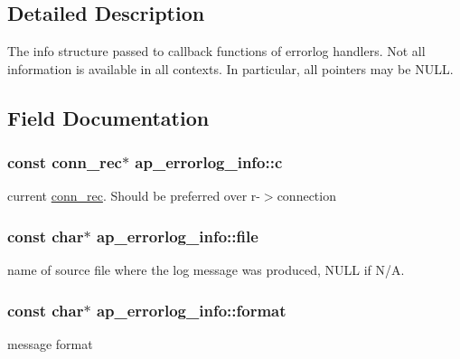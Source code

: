 \subsection{Detailed Description}
The info structure passed to callback functions of errorlog handlers. Not all information is available in all contexts. In particular, all pointers may be N\+U\+LL. 

\subsection{Field Documentation}
\subsubsection[{\texorpdfstring{c}{c}}]{\setlength{\rightskip}{0pt plus 5cm}const {\bf conn\+\_\+rec}$\ast$ ap\+\_\+errorlog\+\_\+info\+::c}\hypertarget{structap__errorlog__info_afe8544f296d2a66d60a7ded1e09f2755}{}\label{structap__errorlog__info_afe8544f296d2a66d60a7ded1e09f2755}
current \hyperlink{structconn__rec}{conn\+\_\+rec}. Should be preferred over r-\/$>$connection 
\subsubsection[{\texorpdfstring{file}{file}}]{\setlength{\rightskip}{0pt plus 5cm}const char$\ast$ ap\+\_\+errorlog\+\_\+info\+::file}\hypertarget{structap__errorlog__info_a6cfae448e006d900d8c3292af4bdcc41}{}\label{structap__errorlog__info_a6cfae448e006d900d8c3292af4bdcc41}
name of source file where the log message was produced, N\+U\+LL if N/A. 
\subsubsection[{\texorpdfstring{format}{format}}]{\setlength{\rightskip}{0pt plus 5cm}const char$\ast$ ap\+\_\+errorlog\+\_\+info\+::format}\hypertarget{structap__errorlog__info_a5f5ee5ad1925c3f59f1b792d902ab9d3}{}\label{structap__errorlog__info_a5f5ee5ad1925c3f59f1b792d902ab9d3}
message format 
